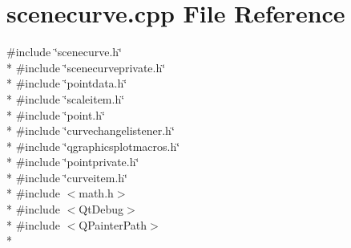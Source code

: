 \section{scenecurve.\+cpp File Reference}
\label{curve_2scenecurve_8cpp}
{\ttfamily \#include \char`\"{}scenecurve.\+h\char`\"{}}\\*
{\ttfamily \#include \char`\"{}scenecurveprivate.\+h\char`\"{}}\\*
{\ttfamily \#include \char`\"{}pointdata.\+h\char`\"{}}\\*
{\ttfamily \#include \char`\"{}scaleitem.\+h\char`\"{}}\\*
{\ttfamily \#include \char`\"{}point.\+h\char`\"{}}\\*
{\ttfamily \#include \char`\"{}curvechangelistener.\+h\char`\"{}}\\*
{\ttfamily \#include \char`\"{}qgraphicsplotmacros.\+h\char`\"{}}\\*
{\ttfamily \#include \char`\"{}pointprivate.\+h\char`\"{}}\\*
{\ttfamily \#include \char`\"{}curveitem.\+h\char`\"{}}\\*
{\ttfamily \#include $<$math.\+h$>$}\\*
{\ttfamily \#include $<$Qt\+Debug$>$}\\*
{\ttfamily \#include $<$Q\+Painter\+Path$>$}\\*
